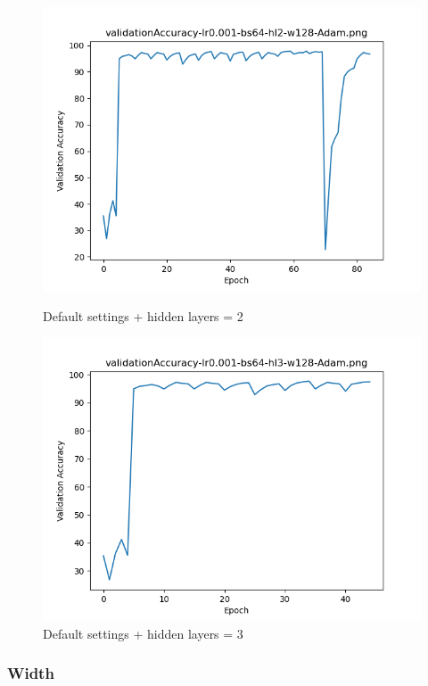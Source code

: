 \documentclass{article}[12pt]
\begin{document}
        \begin{figure}[H]
        \includegraphics[width=\linewidth]{testsResults/validationAccuracy/def.png}
        \caption{Default settings + hidden layers = 2}
        \endminipage
        \includegraphics[width=\linewidth]{testsResults/validationAccuracy/validationAccuracy-lr0.001-bs64-hl3-w128-Adam.png}
        \caption{Default settings + hidden layers = 3}
        \endminipage
    \end{figure}
    \newpage
\subsubsection{Width}
\end{document}
